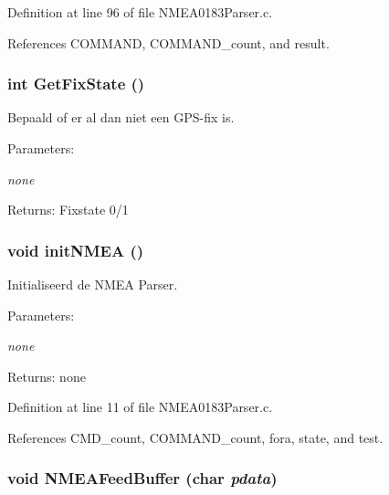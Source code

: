 Definition at line 96 of file NMEA0183Parser.c.

References COMMAND, COMMAND\_\-count, and result.
\subsubsection{\setlength{\rightskip}{0pt plus 5cm}int GetFixState ()}\label{_n_m_e_a0183_parser_8h_ed9172d6f455b6c6c9096bd43ec2fe96}


Bepaald of er al dan niet een GPS-fix is. 

\begin{Desc}
\item[Parameters:]
\begin{description}
\item[{\em none}]\end{description}
\end{Desc}
\begin{Desc}
\item[Returns:]Fixstate 0/1 \end{Desc}
\subsubsection{\setlength{\rightskip}{0pt plus 5cm}void initNMEA ()}\label{_n_m_e_a0183_parser_8h_f3da002283bf981950a10d5dd7f61abd}


Initialiseerd de NMEA Parser. 

\begin{Desc}
\item[Parameters:]
\begin{description}
\item[{\em none}]\end{description}
\end{Desc}
\begin{Desc}
\item[Returns:]none \end{Desc}


Definition at line 11 of file NMEA0183Parser.c.

References CMD\_\-count, COMMAND\_\-count, fora, state, and test.
\subsubsection{\setlength{\rightskip}{0pt plus 5cm}void NMEAFeedBuffer (char {\em pdata})}\label{_n_m_e_a0183_parser_8h_4d3e943e2307c87292092624bc0eff55}


